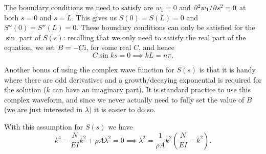 \documentclass[main.tex]{subfiles}
\begin{document}
The boundary conditions we need to satisfy are $w_1 = 0$ and $\pdd{w_1}{s}=0$ at both $s=0$ and $s=L$. This gives us $S(0) = S(L) = 0$ and $S''(0) = S''(L) = 0$. These boundary conditions can only be satisfied for the $\sin$ part of $S(s)$: recalling that we only need to satisfy the real part of the equation, we set $B =-C\mathrm{i} $, for some real $C$, and hence
\begin{equation}
	\label{kbcon}
	C \sin ks = 0 \implies kL = n \pi.
\end{equation}
%

\begin{info}
Another bonus of using the complex wave function for $S(s)$ is that it is handy where there are odd derivatives and a growth/decaying exponential is required for the solution ($k$ can have an imaginary part). It is standard practice to use this complex waveform, and since we never actually need to fully set the value of $B$ (we are just interested in $\lambda$) it is easier to do so. 
\end{info}

With this assumption for $S(s)$ we have
\begin{equation}
k^4 - \frac{N}{E I}k^2 + \rho A \lambda^2 = 0 \implies \lambda^2 = \frac{1}{\rho A}k^2\left(\frac{N}{E I}-k^2\right).
\end{equation}
\end{document}
